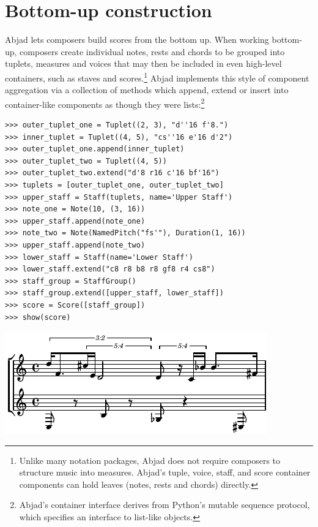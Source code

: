\documentclass{article}
\begin{document}
\section{Bottom-up construction} \label{sec:bottom-up}

Abjad lets composers build scores from the bottom up. When working bottom-up,
composers create individual notes, rests and chords to be grouped into tuplets,
measures and voices that may then be included in even high-level containers,
such as staves and scores.\footnote{Unlike many notation packages, Abjad does
not require composers to structure music into measures. Abjad's tuple, voice,
staff, and score container components can hold leaves (notes, rests and chords)
directly.} Abjad implements this style of component aggregation via a
collection of methods which append, extend or insert into container-like
components as though they were lists:\footnote{Abjad's container interface
derives from Python's mutable sequence protocol, which specifies an interface
to list-like objects.}

\begin{lstlisting}
>>> outer_tuplet_one = Tuplet((2, 3), "d''16 f'8.")
>>> inner_tuplet = Tuplet((4, 5), "cs''16 e'16 d'2")
>>> outer_tuplet_one.append(inner_tuplet)
>>> outer_tuplet_two = Tuplet((4, 5))
>>> outer_tuplet_two.extend("d'8 r16 c'16 bf'16")
>>> tuplets = [outer_tuplet_one, outer_tuplet_two]
>>> upper_staff = Staff(tuplets, name='Upper Staff')
>>> note_one = Note(10, (3, 16))
>>> upper_staff.append(note_one)
>>> note_two = Note(NamedPitch("fs'"), Duration(1, 16))
>>> upper_staff.append(note_two)
>>> lower_staff = Staff(name='Lower Staff')
>>> lower_staff.extend("c8 r8 b8 r8 gf8 r4 cs8")
>>> staff_group = StaffGroup()
>>> staff_group.extend([upper_staff, lower_staff])
>>> score = Score([staff_group])
>>> show(score)
\end{lstlisting}
\includegraphics{assets/lilypond-45865c9ff19c72c1c9f7a6f4234e8546.pdf}
\end{document}
